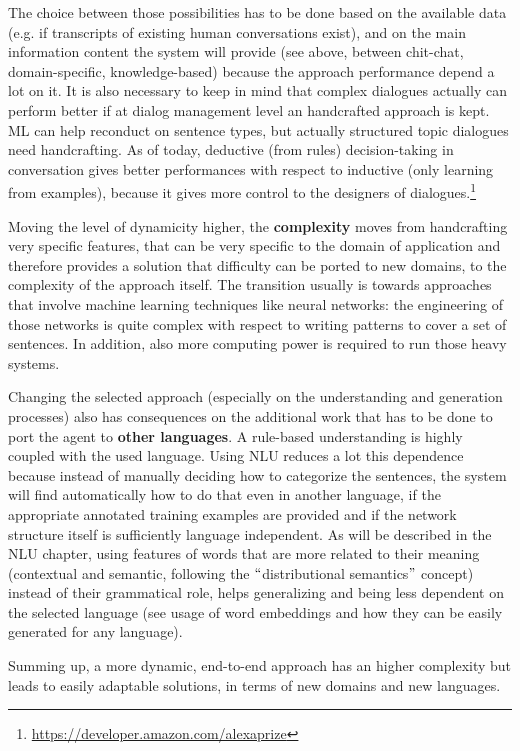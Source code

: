 The choice between those possibilities has to be done based on the available data (e.g. if transcripts of existing human conversations exist), and on the main information content the system will provide (see above, between chit-chat, domain-specific, knowledge-based) because the approach performance depend a lot on it. It is also necessary to keep in mind that complex dialogues actually can perform better if at dialog management level an handcrafted approach is kept. ML can help reconduct on sentence types, but actually structured topic dialogues need handcrafting. As of today, deductive (from rules) decision-taking in conversation gives better performances with respect to inductive (only learning from examples), because it gives more control to the designers of dialogues.\footnote{\url{https://developer.amazon.com/alexaprize}}

Moving the level of dynamicity higher, the \textbf{complexity} moves from handcrafting very specific features, that can be very specific to the domain of application and therefore provides a solution that difficulty can be ported to new domains, to the complexity of the approach itself. The transition usually is towards approaches that involve machine learning techniques like neural networks: the engineering of those networks is quite complex with respect to writing patterns to cover a set of sentences. In addition, also more computing power is required to run those heavy systems.

Changing the selected approach (especially on the understanding and generation processes) also has consequences on the additional work that has to be done to port the agent to \textbf{other languages}. A rule-based understanding is highly coupled with the used language. Using NLU reduces a lot this dependence because instead of manually deciding how to categorize the sentences, the system will find automatically how to do that even in another language, if the appropriate annotated training examples are provided and if the network structure itself is sufficiently language independent. As will be described in the NLU chapter, using features of words that are more related to their meaning (contextual and semantic, following the $``$distributional semantics$"$  concept) instead of their grammatical role, helps generalizing and being less dependent on the selected language (see usage of word embeddings and how they can be easily generated for any language).

Summing up, a more dynamic, end-to-end approach has an higher complexity but leads to easily adaptable solutions, in terms of new domains and new languages.

